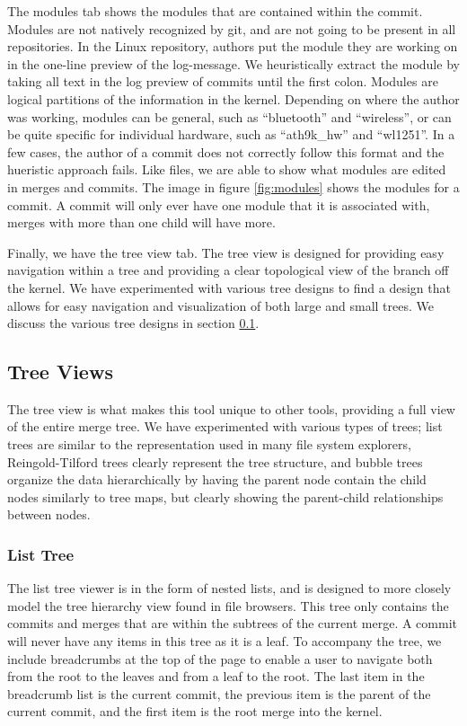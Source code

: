 \documentclass[conference, draftclsnofoot]{IEEEtran}
\begin{document}
The modules tab shows the modules that are contained within the commit. Modules are
not natively recognized by git, and are not going to be present in all repositories.
In the Linux repository, authors put the module they are working on in the one-line
preview of the log-message. We heuristically extract the module by taking all text
in the log preview of commits until the first colon.  Modules are logical partitions
of the information in the kernel. Depending on where the author was working, modules
can be general, such as ``bluetooth'' and ``wireless'', or can be quite specific for
individual hardware, such as ``ath9k\_hw'' and ``wl1251''. In a few cases, the
author of a commit does not correctly follow this format and the hueristic approach
fails. Like files, we are able to show what modules are edited in merges and
commits. The image in figure \ref{fig:modules} shows the modules for a commit. A
commit will only ever have one module that it is associated with, merges with more
than one child will have more.

Finally, we have the tree view tab. The tree view is designed for providing easy
navigation within a tree and providing a clear topological view of the branch off
the kernel. We have experimented with various tree designs to find a design that
allows for easy navigation and visualization of both large and small trees. We
discuss the various tree designs in section \ref{treeview_section}.

\subsection{Tree Views} \label{treeview_section}

The tree view is what makes this tool unique to other tools, providing a full view
of the entire merge tree. We have experimented with various types of trees; list
trees are similar to the representation used in many file system explorers,
Reingold-Tilford trees clearly represent the tree structure, and bubble trees
organize the data hierarchically by having the parent node contain the child nodes
similarly to tree maps, but clearly showing the parent-child relationships between
nodes.

\subsubsection{List Tree}

The list tree viewer is in the form of nested lists, and is designed to more closely
model the tree hierarchy view found in file browsers. This tree only contains the
commits and merges that are within the subtrees of the current merge. A commit will
never have any items in this tree as it is a leaf. To accompany the tree, we include
breadcrumbs at the top of the page to enable a user to navigate both from the root
to the leaves and from a leaf to the root. The last item in the breadcrumb list is
the current commit, the previous item is the parent of the current commit, and the
first item is the root merge into the kernel.
\end{document}
